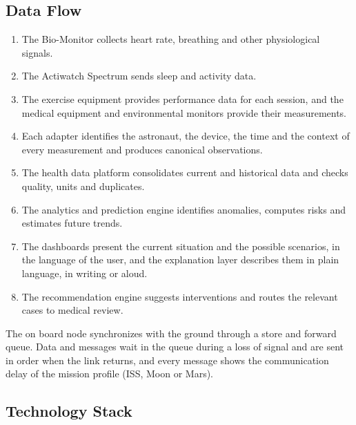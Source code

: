 \subsection{Data Flow}
\label{subsec:data-flow}

\begin{enumerate}
\item The Bio-Monitor collects heart rate, breathing and other physiological signals.
\item The Actiwatch Spectrum sends sleep and activity data.
\item The exercise equipment provides performance data for each session, and the medical equipment and environmental monitors provide their measurements.
\item Each adapter identifies the astronaut, the device, the time and the context of every measurement and produces canonical observations.
\item The health data platform consolidates current and historical data and checks quality, units and duplicates.
\item The analytics and prediction engine identifies anomalies, computes risks and estimates future trends.
\item The dashboards present the current situation and the possible scenarios, in the language of the user, and the explanation layer describes them in plain language, in writing or aloud.
\item The recommendation engine suggests interventions and routes the relevant cases to medical review.
\end{enumerate}

The on board node synchronizes with the ground through a store and forward queue. Data and messages wait in the queue during a loss of signal and are sent in order when the link returns, and every message shows the communication delay of the mission profile (ISS, Moon or Mars).

\subsection{Technology Stack}
\label{subsec:technology-stack}

